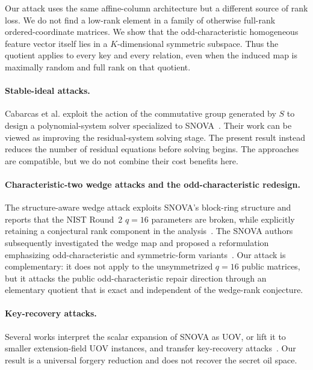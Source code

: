 \documentclass[11pt]{article}
\newcommand{\SNOVA}{\textsf{SNOVA}}
\begin{document}
Our attack uses the same affine-column architecture but a different source of rank loss.  We do not find a low-rank element in a family of otherwise full-rank ordered-coordinate matrices.  We show that the odd-characteristic homogeneous feature vector itself lies in a $K$-dimensional symmetric subspace.  Thus the quotient applies to every key and every relation, even when the induced map is maximally random and full rank on that quotient.

\paragraph{Stable-ideal attacks.}
Cabarcas et al. exploit the action of the commutative group generated by $S$ to design a polynomial-system solver specialized to \SNOVA{}~\cite{Cabarcas2025SNOVA}.  Their work can be viewed as improving the residual-system solving stage.  The present result instead reduces the number of residual equations before solving begins.  The approaches are compatible, but we do not combine their cost benefits here.

\paragraph{Characteristic-two wedge attacks and the odd-characteristic redesign.}
The structure-aware wedge attack exploits \SNOVA{}'s block-ring structure and reports that the NIST Round~2 $q=16$ parameters are broken, while explicitly retaining a conjectural rank component in the analysis~\cite{BrosEtAl2026SNOVAWedge}.  The \SNOVA{} authors subsequently investigated the wedge map and proposed a reformulation emphasizing odd-characteristic and symmetric-form variants~\cite{TsengEtAl2026Wedge,DingEtAl2026Reformulating}.  Our attack is complementary: it does not apply to the unsymmetrized $q=16$ public matrices, but it attacks the public odd-characteristic repair direction through an elementary quotient that is exact and independent of the wedge-rank conjecture.

\paragraph{Key-recovery attacks.}
Several works interpret the scalar expansion of \SNOVA{} as UOV, or lift it to smaller extension-field UOV instances, and transfer key-recovery attacks~\cite{IkematsuAkiyama2024,LiDing2024,NakamuraEtAl2025}.  Our result is a universal forgery reduction and does not recover the secret oil space.
\end{document}
